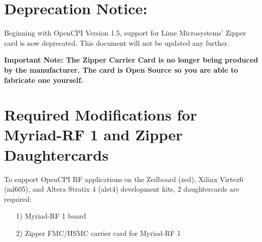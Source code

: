 \documentclass{article}
\begin{document}
\section*{Deprecation Notice:}
Beginning with OpenCPI Version 1.5, support for Lime Microsystems' Zipper card is now deprecated. This document will not be updated any further.\\ \medskip

\textbf{Important Note: The Zipper Carrier Card is no longer being produced by the manufacturer. The card is Open Source so you are able to fabricate one yourself.}
\section*{Required Modifications for Myriad-RF 1 and Zipper Daughtercards}
To support OpenCPI RF applications on the Zedboard (zed), Xilinx Virtex6 (ml605), and Altera Stratix 4 (alst4) development kits, 2 daughtercards are required:\par
	\begin{itemize}
	\item[1)] Myriad-RF 1 board
	\item[2)] Zipper FMC/HSMC carrier card for Myriad-RF 1
	\end{itemize}
\end{document}
